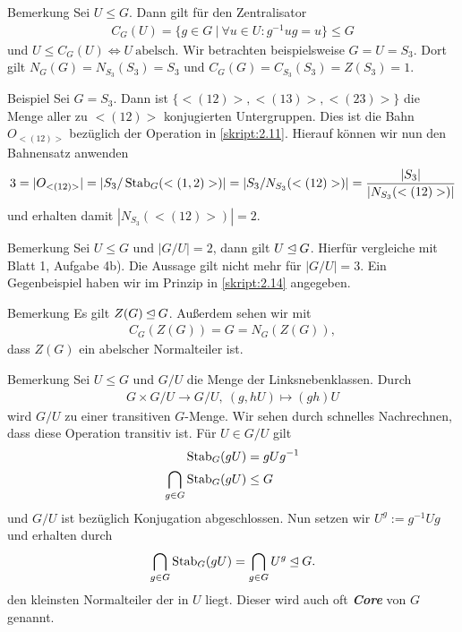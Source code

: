 \begin{genericdf}{Bemerkung} \label{skript:2.13}
Sei $U \leq G$. Dann gilt für den Zentralisator
\begin{align*}
C_G(U) = \lbrace g \in G \ | \ \forall u \in U : g^{-1} u g = u \rbrace \leq G
\end{align*}
und $U \leq C_G(U) \Leftrightarrow U \ \text{abelsch}$.
Wir betrachten beispielsweise $G=U=S_3$.
Dort gilt $N_G(G) = N_{S_3}(S_3) = S_3$ und $C_G(G) = C_{S_3}(S_3) = Z(S_3) = 1$.
\end{genericdf}

\begin{genericdf}{Beispiel} \label{skript:2.14}
Sei $G = S_3$. Dann ist $\lbrace <(12)>, <(13)>, <(23)> \rbrace$ die Menge aller zu $<(12)>$ konjugierten Untergruppen. Dies ist die Bahn $O_{<(12)>}$ bezüglich der Operation in \ref{skript:2.11}.
Hierauf können wir nun den Bahnensatz anwenden
\begin{align*}
3 = |O_{<(12)>}| = |S_3 / \operatorname{Stab}_G(<(1,2)>)| = | S_3 / N_{S_3}(<(12)>) |  = \frac{|S_3|}{|N_{S_3}(<(12)>)|}
\end{align*}
und erhalten damit $|N_{S_3}(<(12)>)| = 2$.
\end{genericdf}

\begin{genericdf}{Bemerkung} \label{skript:2.15}
Sei $U \leq G$ und $|G / U | = 2$, dann gilt $U \unlhd G$. Hierfür vergleiche mit Blatt 1, Aufgabe 4b).
Die Aussage gilt nicht mehr für $|G / U | = 3$. Ein Gegenbeispiel haben wir im Prinzip in \ref{skript:2.14}
angegeben.
\end{genericdf}

\begin{genericdf}{Bemerkung} \label{skript:2.16}
Es gilt $Z(G) \unlhd G$. Außerdem sehen wir mit 
\begin{align*}
C_G(Z(G)) = G = N_G(Z(G)),
\end{align*}
dass $Z(G)$ ein abelscher Normalteiler ist.
\end{genericdf}

\begin{genericdf}{Bemerkung} \label{skript:2.17} 
Sei $U \leq G$ und $G / U$ die Menge der Linksnebenklassen. Durch
\begin{align*}
G \times G / U \to G / U, \ (g,hU) \mapsto (gh) U
\end{align*}
wird $G / U$ zu einer transitiven $G$-Menge. Wir sehen durch schnelles Nachrechnen, dass diese Operation
transitiv ist.
Für $U \in G / U$ gilt
\begin{align*}
\operatorname{Stab}_G(gU) &= g U g^{-1}\\
\bigcap \limits_{g \in G } \operatorname{Stab}_G(gU) &\leq G
\end{align*}
und $G / U$ ist bezüglich Konjugation abgeschlossen. Nun setzen wir $U^g := g^{-1} U g$ und erhalten durch
\begin{align*}
\bigcap \limits_{g \in G } \operatorname{Stab}_G(gU) = \bigcap \limits_{g \in G } U^g \unlhd G.
\end{align*}
den kleinsten Normalteiler der in $U$ liegt. Dieser wird auch oft \textbf{\textit{Core}} von $G$ genannt.

\end{genericdf}